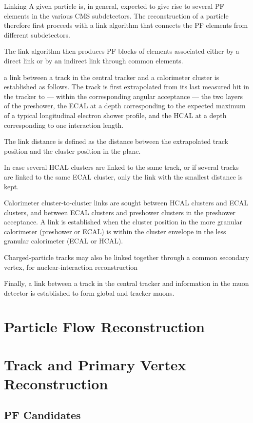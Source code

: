 Linking
A given particle is, in general, expected to give rise to several PF elements in the various CMS subdetectors. The reconstruction of a particle therefore first proceeds with a link algorithm that connects the PF elements from different subdetectors.

The link algorithm then produces PF blocks of elements associated either by a direct link or by an indirect link through common elements.

a link between a track in the central tracker and a calorimeter cluster is established as follows. The track is first extrapolated from its last measured hit in the tracker to — within the corresponding angular acceptance — the two layers of the preshower, the ECAL at a depth corresponding to the expected maximum of a typical longitudinal electron shower profile, and the HCAL at a depth corresponding to one interaction length.

The link distance is defined as the distance between the extrapolated track position and the cluster position in the \etaphi plane.

In case several HCAL clusters are linked to the same track, or if several tracks are linked to the same ECAL cluster, only the link with the smallest distance is kept.

Calorimeter cluster-to-cluster links are sought between HCAL clusters and ECAL clusters, and between ECAL clusters and preshower clusters in the preshower acceptance. A link is established when the cluster position in the more granular calorimeter (preshower or ECAL) is within the cluster envelope in the less granular calorimeter (ECAL or HCAL).

Charged-particle tracks may also be linked together through a common secondary vertex, for nuclear-interaction reconstruction

Finally, a link between a track in the central tracker and information in the muon detector is established to form global and tracker muons.

\section{Particle Flow Reconstruction}
\section{Track and Primary Vertex Reconstruction}
\subsection{PF Candidates}
